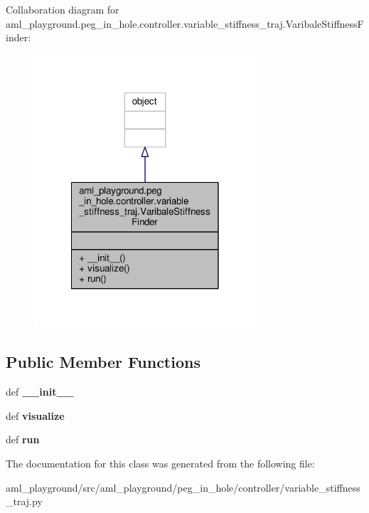Collaboration diagram for aml\-\_\-playground.\-peg\-\_\-in\-\_\-hole.\-controller.\-variable\-\_\-stiffness\-\_\-traj.\-Varibale\-Stiffness\-Finder\-:\nopagebreak
\begin{figure}[H]
\begin{center}
\leavevmode
\includegraphics[width=234pt]{classaml__playground_1_1peg__in__hole_1_1controller_1_1variable__stiffness__traj_1_1_varibale_stiffness_finder__coll__graph}
\end{center}
\end{figure}
\subsection*{Public Member Functions}
\begin{DoxyCompactItemize}
\item 
\hypertarget{classaml__playground_1_1peg__in__hole_1_1controller_1_1variable__stiffness__traj_1_1_varibale_stiffness_finder_aa994c6fdffa767f6fe2b559b63171230}{def {\bfseries \-\_\-\-\_\-init\-\_\-\-\_\-}}\label{classaml__playground_1_1peg__in__hole_1_1controller_1_1variable__stiffness__traj_1_1_varibale_stiffness_finder_aa994c6fdffa767f6fe2b559b63171230}

\item 
\hypertarget{classaml__playground_1_1peg__in__hole_1_1controller_1_1variable__stiffness__traj_1_1_varibale_stiffness_finder_a79bd272a4662126217155b91116d4e8a}{def {\bfseries visualize}}\label{classaml__playground_1_1peg__in__hole_1_1controller_1_1variable__stiffness__traj_1_1_varibale_stiffness_finder_a79bd272a4662126217155b91116d4e8a}

\item 
\hypertarget{classaml__playground_1_1peg__in__hole_1_1controller_1_1variable__stiffness__traj_1_1_varibale_stiffness_finder_a4b4836b6cac32d809e150badcccbdc4c}{def {\bfseries run}}\label{classaml__playground_1_1peg__in__hole_1_1controller_1_1variable__stiffness__traj_1_1_varibale_stiffness_finder_a4b4836b6cac32d809e150badcccbdc4c}

\end{DoxyCompactItemize}


The documentation for this class was generated from the following file\-:\begin{DoxyCompactItemize}
\item 
aml\-\_\-playground/src/aml\-\_\-playground/peg\-\_\-in\-\_\-hole/controller/variable\-\_\-stiffness\-\_\-traj.\-py\end{DoxyCompactItemize}
